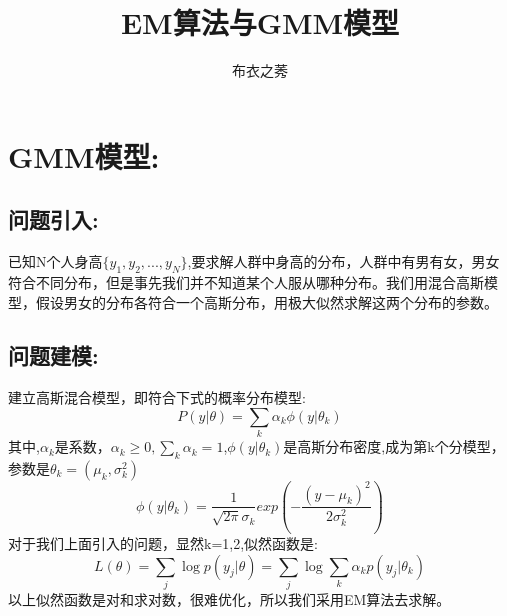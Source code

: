 \documentclass{article}
\title{EM算法与GMM模型}
\author{布衣之莠}
\begin{document}
\maketitle
\section{GMM模型:}
\subsection{问题引入:}
已知N个人身高$\{y_1,y_2,...,y_N\}$,要求解人群中身高的分布，人群中有男有女，男女符合不同分布，但是事先我们并不知道某个人服从哪种分布。我们用混合高斯模型，假设男女的分布各符合一个高斯分布，用极大似然求解这两个分布的参数。
\subsection{问题建模:}
建立高斯混合模型，即符合下式的概率分布模型:
\begin{equation}
P(y|\theta)=\sum_k\alpha_k\phi(y|\theta_k)  \tag{1.2.1}
\end{equation}
其中,$\alpha_k$是系数，$\alpha_k \ge 0,\sum_k\alpha_k=1$,$\phi(y|\theta_k)$是高斯分布密度,成为第k个分模型，参数是$\theta_k=(\mu_k,\sigma_k^2)$
\begin{equation}
\phi(y|\theta_k)=\frac{1}{\sqrt{2\pi}\sigma_k}exp(-\frac{(y-\mu_k)^2}{2\sigma_k^2}) \tag{1.2.2}
\end{equation}
对于我们上面引入的问题，显然k=1,2,似然函数是:
\begin{equation}
L(\theta)=\sum_j \log p(y_j|\theta)=\sum_j \log \sum_k \alpha_k p(y_j|\theta_k) \tag{1.2.3}
\end{equation}
以上似然函数是对和求对数，很难优化，所以我们采用EM算法去求解。
\end{document}

